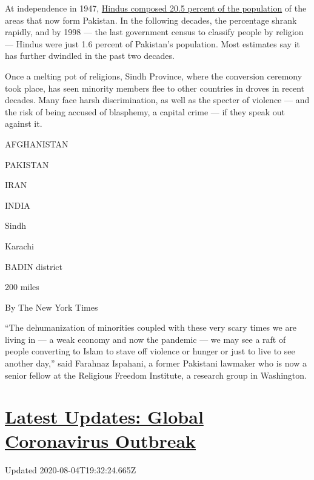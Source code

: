 At independence in 1947,
\href{https://theprint.in/opinion/modi-critics-decry-india-mistreating-minorities-but-cant-whitewash-pak-islamisation/355536/}{Hindus
composed 20.5 percent of the population} of the areas that now form
Pakistan. In the following decades, the percentage shrank rapidly, and
by 1998 --- the last government census to classify people by religion
--- Hindus were just 1.6 percent of Pakistan's population. Most
estimates say it has further dwindled in the past two decades.

Once a melting pot of religions, Sindh Province, where the conversion
ceremony took place, has seen minority members flee to other countries
in droves in recent decades. Many face harsh discrimination, as well as
the specter of violence --- and the risk of being accused of blasphemy,
a capital crime --- if they speak out against it.

AFGHANISTAN

PAKISTAN

IRAN

INDIA

Sindh

Karachi

BADIN district

200 miles

By The New York Times

``The dehumanization of minorities coupled with these very scary times
we are living in --- a weak economy and now the pandemic --- we may see
a raft of people converting to Islam to stave off violence or hunger or
just to live to see another day,'' said Farahnaz Ispahani, a former
Pakistani lawmaker who is now a senior fellow at the Religious Freedom
Institute, a research group in Washington.

\hypertarget{latest-updates-global-coronavirus-outbreak}{%
\section{\texorpdfstring{\href{https://www.nytimes3xbfgragh.onion/2020/08/04/world/coronavirus-cases.html?action=click\&pgtype=Article\&state=default\&region=MAIN_CONTENT_1\&context=storylines_live_updates}{Latest
Updates: Global Coronavirus
Outbreak}}{Latest Updates: Global Coronavirus Outbreak}}\label{latest-updates-global-coronavirus-outbreak}}

Updated 2020-08-04T19:32:24.665Z

